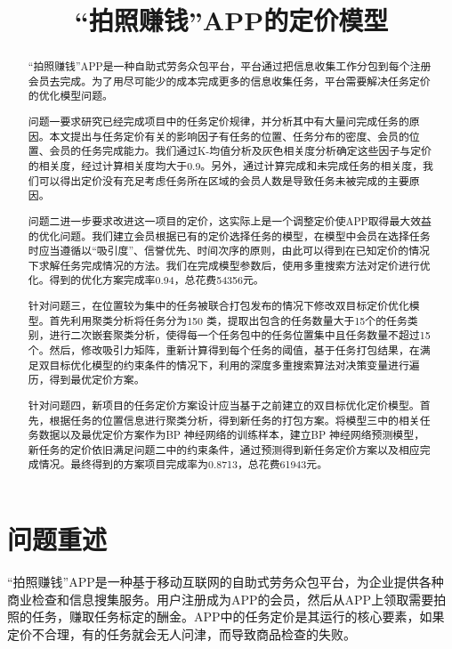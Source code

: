 \documentclass[withoutpreface,bwprint]{cumcmthesis} %
\title{“拍照赚钱”APP的定价模型}
\begin{document}
\maketitle
\begin{abstract}
    “拍照赚钱”APP是一种自助式劳务众包平台，平台通过把信息收集工作分包到每个注册会员去完成。为了用尽可能少的成本完成更多的信息收集任务，平台需要解决任务定价的优化模型问题。

    问题一要求研究已经完成项目中的任务定价规律，并分析其中有大量问完成任务的原因。本文提出与任务定价有关的影响因子有任务的位置、任务分布的密度、会员的位置、会员的任务完成能力。我们通过K-均值分析及灰色相关度分析确定这些因子与定价的相关度，经过计算相关度均大于0.9。另外，通过计算完成和未完成任务的相关度，我们可以得出定价没有充足考虑任务所在区域的会员人数是导致任务未被完成的主要原因。

    问题二进一步要求改进这一项目的定价，这实际上是一个调整定价使APP取得最大效益的优化问题。我们建立会员根据已有的定价选择任务的模型，在模型中会员在选择任务时应当遵循以“吸引度”、信誉优先、时间次序的原则，由此可以得到在已知定价的情况下求解任务完成情况的方法。我们在完成模型参数后，使用多重搜索方法对定价进行优化。得到的优化方案完成率0.94，总花费54356元。

    针对问题三，在位置较为集中的任务被联合打包发布的情况下修改双目标定价优化模型。首先利用聚类分析将任务分为150 类，提取出包含的任务数量大于15个的任务类别，进行二次嵌套聚类分析，使得每一个任务包中的任务位置集中且任务数量不超过15个。然后，修改吸引力矩阵，重新计算得到每个任务的阈值，基于任务打包结果，在满足双目标优化模型的约束条件的情况下，利用的深度多重搜索算法对决策变量进行遍历，得到最优定价方案。

    针对问题四，新项目的任务定价方案设计应当基于之前建立的双目标优化定价模型。首先，根据任务的位置信息进行聚类分析，得到新任务的打包方案。将模型三中的相关任务数据以及最优定价方案作为BP 神经网络的训练样本，建立BP 神经网络预测模型，新任务的定价依旧满足问题二中的约束条件，通过预测得到新任务定价方案以及相应完成情况。最终得到的方案项目完成率为0.8713，总花费61943元。

\end{abstract}
\section{问题重述}
“拍照赚钱”APP是一种基于移动互联网的自助式劳务众包平台，为企业提供各种商业检查和信息搜集服务。用户注册成为APP的会员，然后从APP上领取需要拍照的任务，赚取任务标定的酬金。APP中的任务定价是其运行的核心要素，如果定价不合理，有的任务就会无人问津，而导致商品检查的失败。
\end{document}
